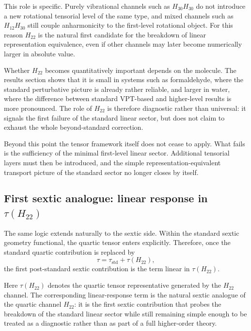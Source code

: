 \documentclass[aip,jcp,reprint,floatfix]{revtex4-2}
\begin{document}
This role is specific. Purely vibrational channels such as
$H_{30}H_{30}$ do not introduce a new rotational tensorial level of
the same type, and mixed channels such as $H_{12}H_{30}$ still couple
anharmonicity to the first-level rotational object. For this reason
$H_{22}$ is the natural first candidate for the breakdown of linear
representation equivalence, even if other channels may later become
numerically larger in absolute value.

Whether $H_{22}$ becomes quantitatively important depends on the
molecule. The results section shows that it is small in systems such
as formaldehyde, where the standard perturbative picture is already
rather reliable, and larger in water, where the difference between
standard VPT-based and higher-level results is more pronounced. The
role of $H_{22}$ is therefore diagnostic rather than universal: it
signals the first failure of the standard linear sector, but does not
claim to exhaust the whole beyond-standard correction.

Beyond this point the tensor framework itself does not cease to apply.
What fails is the sufficiency of the minimal first-level linear sector.
Additional tensorial layers must then be introduced, and the simple
representation-equivalent transport picture of the standard sector no
longer closes by itself.

\subsection{First sextic analogue: linear response in \texorpdfstring{$\tau(H_{22})$}{tau(H22)}}

The same logic extends naturally to the sextic side. Within the
standard sextic geometry functional, the quartic tensor enters
explicitly. Therefore, once the standard quartic contribution is
replaced by
\begin{equation}
\tau = \tau_{\mathrm{std}} + \tau(H_{22}),
\end{equation}
the first post-standard sextic contribution is the term linear in
$\tau(H_{22})$.

Here $\tau(H_{22})$ denotes the quartic tensor representative
generated by the $H_{22}$ channel. The corresponding linear-response
term is the natural sextic analogue of the quartic channel $H_{22}$:
it is the first sextic contribution that probes the breakdown of the
standard linear sector while still remaining simple enough to be
treated as a diagnostic rather than as part of a full higher-order
theory.
\end{document}
